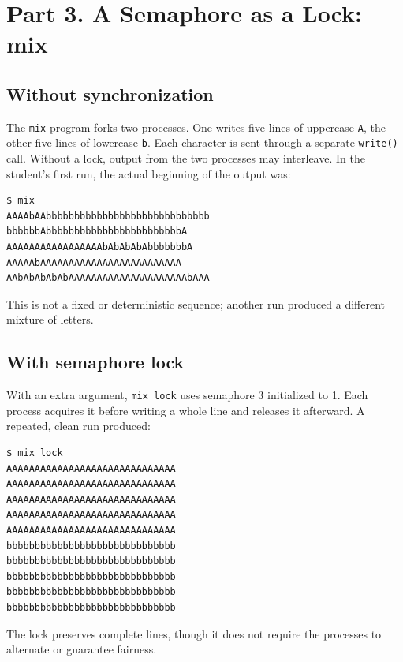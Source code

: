 \documentclass[12pt,a4paper]{article}
\begin{document}
\section{Part 3. A Semaphore as a Lock: mix}
\subsection{Without synchronization}
The \texttt{mix} program forks two processes. One writes five lines of uppercase \texttt{A}, the other five lines of lowercase \texttt{b}. Each character is sent through a separate \texttt{write()} call. Without a lock, output from the two processes may interleave. In the student's first run, the actual beginning of the output was:
\begin{lstlisting}[caption={Figure 3.1 -- Actual interleaved output without a lock}]
$ mix
AAAAbAAbbbbbbbbbbbbbbbbbbbbbbbbbbbbb
bbbbbbAbbbbbbbbbbbbbbbbbbbbbbbbA
AAAAAAAAAAAAAAAAAbAbAbAbAbbbbbbbA
AAAAAbAAAAAAAAAAAAAAAAAAAAAAAAA
AAbAbAbAbAbAAAAAAAAAAAAAAAAAAAAAbAAA
\end{lstlisting}
This is not a fixed or deterministic sequence; another run produced a different mixture of letters.

\subsection{With semaphore lock}
With an extra argument, \texttt{mix lock} uses semaphore 3 initialized to 1. Each process acquires it before writing a whole line and releases it afterward. A repeated, clean run produced:
\begin{lstlisting}[caption={Figure 3.2 -- Actual intact lines with semaphore locking}]
$ mix lock
AAAAAAAAAAAAAAAAAAAAAAAAAAAAAA
AAAAAAAAAAAAAAAAAAAAAAAAAAAAAA
AAAAAAAAAAAAAAAAAAAAAAAAAAAAAA
AAAAAAAAAAAAAAAAAAAAAAAAAAAAAA
AAAAAAAAAAAAAAAAAAAAAAAAAAAAAA
bbbbbbbbbbbbbbbbbbbbbbbbbbbbbb
bbbbbbbbbbbbbbbbbbbbbbbbbbbbbb
bbbbbbbbbbbbbbbbbbbbbbbbbbbbbb
bbbbbbbbbbbbbbbbbbbbbbbbbbbbbb
bbbbbbbbbbbbbbbbbbbbbbbbbbbbbb
\end{lstlisting}
The lock preserves complete lines, though it does not require the processes to alternate or guarantee fairness.
\end{document}
